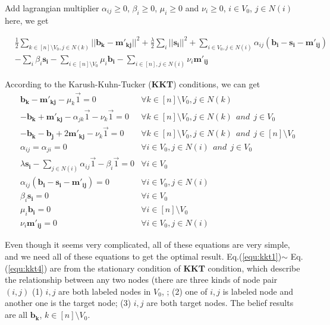 Add lagrangian multiplier $\alpha_{ij} \geq 0$, $\beta_i \geq 0$, $\mu_i \geq 0$ and $\nu_i\geq 0$, $i\in V_0$, $j\in N(i)$  here, we get

\begin{align*}
&\frac{1}{2}\mathop{\sum}_{k \in [n]\setminus V_0, j\in N(k)}||\mathbf{b_k} - \mathbf{m'_{kj}}||^2 + \frac{\lambda}{2}\sum_i||\mathbf{s_i}||^2 + \mathop{\sum}_{i\in V_0,j\in N(i)}\alpha_{ij}(\mathbf{b_i}
-\mathbf{s_i} -  \mathbf{m'_{ij}}) \\&- \sum_i \beta_{i}\mathbf{s_i} - \sum_{i\in [n]\setminus V_0} \mu_{i}\mathbf{b_i} - \sum_{i\in [n], j\in N(i)} \nu_{i}\mathbf{m'_{ij}}
\end{align*}



According to the Karush-Kuhn-Tucker (\textbf{KKT}) conditions, we can get
\begin{align}
\label{equ:kkt1}
&\mathbf{b_k} - \mathbf{m'_{kj}} - \mu_k\vec{1} = 0 ~~~~&\forall k\in [n]\setminus V_0, j\in N(k)\\
\label{equ:kkt2}
&- \mathbf{b_k} + \mathbf{m'_{kj}} - \alpha_{jk}\vec{1} - \nu_{k}\vec{1} = 0 &\forall k\in [n]\setminus V_0, j\in N(k)~~and~~j\in V_0\\
\label{equ:kkt3}
&- \mathbf{b_k} - \mathbf{b_j} + 2\mathbf{m'_{kj}} - \nu_{k}\vec{1} = 0 &\forall k\in [n]\setminus V_0, j\in N(k)~~and~~j\in [n]\setminus V_0\\
\label{equ:kkt4}
& \alpha_{ij} = \alpha_{ji} = 0 &\forall i\in V_0, j\in N(i)~~and~~j\in V_0\\
\label{equ:kkt5}
&\lambda \mathbf{s_i} - \sum_{j\in N(i)}\alpha_{ij}\vec{1} - \beta_i \vec{1}=0 &\forall i\in V_0\\
\label{equ:kkt6}
&\alpha_{ij}(\mathbf{b_i}-\mathbf{s_i}- \mathbf{m'_{ij}}) = 0 &\forall i\in V_0, j\in N(i)\\
\label{equ:kkt7}
&\beta_i \mathbf{s_i} = 0 &\forall i\in V_0\\
\label{equ:kkt8}
&\mu_i \mathbf{b_i} = 0 &\forall i\in [n]\setminus V_0\\
\label{equ:kkt9}
&\nu_i \mathbf{m'_{ij}} = 0 &\forall i\in V_0, j\in N(i)
\end{align}

Even though it seems very complicated, all of these equations are very simple, and we need all of these equations to get the optimal result.  Eq.(\ref{equ:kkt1})$\sim$ Eq.(\ref{equ:kkt4}) are from the stationary condition of \textbf{KKT} condition, which describe the relationship between any two nodes (there are three kinds of node pair $(i,j)$ (1) $i,j$ are both labeled nodes in $V_0$, ; (2) one of $i,j$ is labeled node and another one is the target node; (3) $i,j$ are both target nodes. The belief results are all $\mathbf{b_k}$, $k\in [n]\setminus V_0$.

